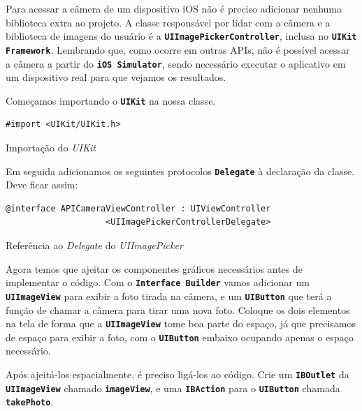 \documentclass[a4paper,12pt,brazil,oneside]{book}
\begin{document}
Para acessar a câmera de um dispositivo iOS não é preciso adicionar nenhuma biblioteca extra ao projeto. A classe responsável por lidar com a câmera e a biblioteca de imagens do usuário é a \texttt{\textbf{UIImagePickerController}}, inclusa no \texttt{\textbf{UIKit Framework}}. Lembrando que, como ocorre em outras APIs, não é possível acessar a câmera a partir do \texttt{\textbf{iOS Simulator}}, sendo necessário executar o aplicativo em um dispositivo real para que vejamos os resultados.

Começamos importando o \texttt{\textbf{UIKit}} na nossa classe.

\begin{listing}[H]
\begin{verbatim}
#import <UIKit/UIKit.h>
\end{verbatim}
\caption{Importação do \emph{UIKit}}
\end{listing}


Em seguida adicionamos os seguintes protocolos \texttt{\textbf{Delegate}} à declaração da classe. Deve ficar assim:

\begin{listing}[H]
\begin{verbatim}
@interface APICameraViewController : UIViewController
                    <UIImagePickerControllerDelegate>
\end{verbatim}
\caption{Referência ao \emph{Delegate} do \emph{UIImagePicker}}
\end{listing}


Agora temos que ajeitar os componentes gráficos necessários antes de implementar o código. Com o \texttt{\textbf{Interface Builder}} vamos adicionar um \texttt{\textbf{UIImageView}} para exibir a foto tirada na câmera, e um \texttt{\textbf{UIButton}} que terá a função de chamar a câmera para tirar uma nova foto. Coloque os dois elementos na tela de forma que a \texttt{\textbf{UIImageView}} tome boa parte do espaço, já que precisamos de espaço para exibir a foto, com o \texttt{\textbf{UIButton}} embaixo ocupando apenas o espaço necessário.

Após ajeitá-los espacialmente, é preciso ligá-los ao código. Crie um \texttt{\textbf{IBOutlet}} da \texttt{\textbf{UIImageView}} chamado \texttt{\textbf{imageView}}, e uma \texttt{\textbf{IBAction}} para o \texttt{\textbf{UIButton}} chamada \texttt{\textbf{takePhoto}}.
\end{document}
